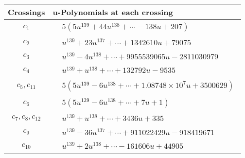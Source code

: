 \documentclass[1p]{elsarticle_modified}
\theoremstyle{definition}
\begin{document}
\begin{tabular}{m{50pt}|m{274pt}}
Crossings & \hspace{64pt}u-Polynomials at each crossing \\
\hline $$\begin{aligned}c_{1}\end{aligned}$$&$\begin{aligned}
&5(5 u^{139}+44 u^{138}+\cdots-138 u+207)
\end{aligned}$\\
\hline $$\begin{aligned}c_{2}\end{aligned}$$&$\begin{aligned}
&u^{139}+23 u^{137}+\cdots+1342610 u+79075
\end{aligned}$\\
\hline $$\begin{aligned}c_{3}\end{aligned}$$&$\begin{aligned}
&u^{139}-4 u^{138}+\cdots+9955539065 u-2811030979
\end{aligned}$\\
\hline $$\begin{aligned}c_{4}\end{aligned}$$&$\begin{aligned}
&u^{139}+u^{138}+\cdots+132792 u-9535
\end{aligned}$\\
\hline $$\begin{aligned}c_{5},c_{11}\end{aligned}$$&$\begin{aligned}
&5(5 u^{139}-6 u^{138}+\cdots+1.08748\times10^{7} u+3500629)
\end{aligned}$\\
\hline $$\begin{aligned}c_{6}\end{aligned}$$&$\begin{aligned}
&5(5 u^{139}-6 u^{138}+\cdots+7 u+1)
\end{aligned}$\\
\hline $$\begin{aligned}c_{7},c_{8},c_{12}\end{aligned}$$&$\begin{aligned}
&u^{139}+u^{138}+\cdots+3436 u+335
\end{aligned}$\\
\hline $$\begin{aligned}c_{9}\end{aligned}$$&$\begin{aligned}
&u^{139}-36 u^{137}+\cdots+911022429 u-918419671
\end{aligned}$\\
\hline $$\begin{aligned}c_{10}\end{aligned}$$&$\begin{aligned}
&u^{139}+2 u^{138}+\cdots-161606 u+44905
\end{aligned}$\\
\hline
\end{tabular}\\~\\
\end{document}

